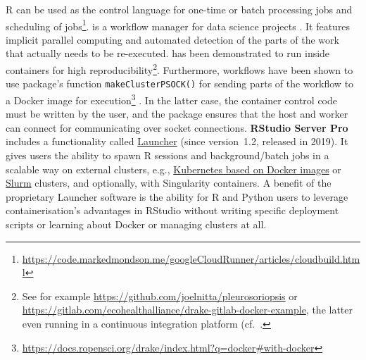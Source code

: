 R can be used as the control language for one-time or batch processing
jobs and scheduling of
jobs\footnote{\href{https://code.markedmondson.me/googleCloudRunner/articles/cloudbuild.html}{https://code.markedmondson.me/googleCloudRunner/articles/cloudbuild.html}}.
\label{drake} \textbf{} is a workflow manager for data
science projects \citep{landau_drake_2019}. It features implicit
parallel computing and automated detection of the parts of the work that
actually needs to be re-executed.  has been demonstrated
to run inside containers for high
reproducibility\footnote{See for example \href{https://github.com/joelnitta/pleurosoriopsis}{https://github.com/joelnitta/pleurosoriopsis} or \href{https://gitlab.com/ecohealthalliance/drake-gitlab-docker-example}{https://gitlab.com/ecohealthalliance/drake-gitlab-docker-example}, the latter even running in a continuous integration platform (cf.~.}.
Furthermore,  workflows have been shown to use
 package's function \texttt{makeClusterPSOCK()} for
sending parts of the workflow to a Docker image for
execution\footnote{\href{https://docs.ropensci.org/drake/index.html?q=docker\#with-docker}{https://docs.ropensci.org/drake/index.html?q=docker\#with-docker}}
\citep[see package's function documentation;~][]{future_2020}. In the
latter case, the container control code must be written by the user, and
the  package ensures that the host and worker can
connect for communicating over socket connections. \textbf{RStudio
Server Pro} includes a functionality called
\href{https://solutions.rstudio.com/launcher/overview/}{Launcher} (since
version~1.2, released in 2019). It gives users the ability to spawn R
sessions and background/batch jobs in a scalable way on external
clusters, e.g.,
\href{https://support.rstudio.com/hc/en-us/articles/360019253393-Using-Docker-images-with-RStudio-Server-Pro-Launcher-and-Kubernetes}{Kubernetes
based on Docker images} or \href{https://slurm.schedmd.com/}{Slurm}
clusters, and optionally, with Singularity containers. A benefit of the
proprietary Launcher software is the ability for R and Python users to
leverage containerisation's advantages in RStudio without writing
specific deployment scripts or learning about Docker or managing
clusters at all.

